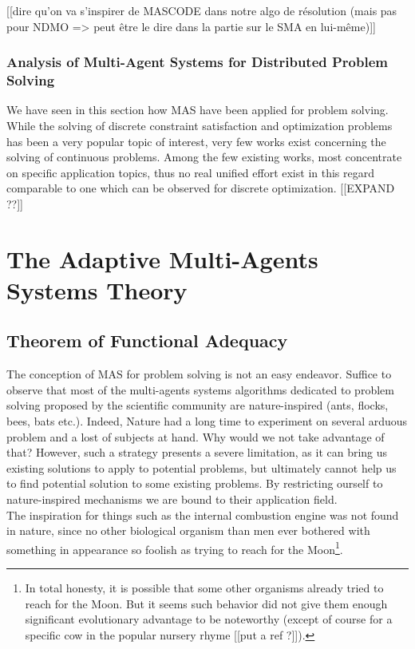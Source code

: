 [[dire qu'on va s'inspirer de MASCODE dans notre algo de résolution (mais pas pour NDMO => peut être le dire dans la partie sur le SMA en lui-même)]]

\subsubsection{Analysis of Multi-Agent Systems for Distributed Problem Solving}

We have seen in this section how MAS have been applied for problem solving. While the solving of discrete constraint satisfaction and optimization problems has been a very popular topic of interest, very few works exist concerning the solving of continuous problems. Among the few existing works, most concentrate on specific application topics, thus no real unified effort exist in this regard comparable to one which can be observed for discrete optimization.
[[EXPAND ??]]

\section{The Adaptive Multi-Agents Systems Theory}

\subsection{Theorem of Functional Adequacy}

The conception of MAS for problem solving is not an easy endeavor. Suffice to observe that most of the multi-agents systems algorithms dedicated to problem solving proposed by the scientific community are nature-inspired (ants, flocks, bees, bats etc.). Indeed, Nature had a long time to experiment on several arduous problem and a lost of subjects at hand. Why would we not take advantage of that? However, such a strategy presents a severe limitation, as it can bring us existing solutions to apply to potential problems, but ultimately cannot help us to find potential solution to some existing problems. By restricting ourself to nature-inspired mechanisms we are bound to their application field.\\
The inspiration for things such as the internal combustion engine was not found in nature, since no other biological organism than men ever bothered with something in appearance so foolish as trying to reach for the Moon\footnote{In total honesty, it is possible that some other organisms already tried to reach for the Moon. But it seems such behavior did not give them enough significant evolutionary advantage to be noteworthy (except of course for a specific cow in the popular nursery rhyme [[put a ref ?]]).}.


